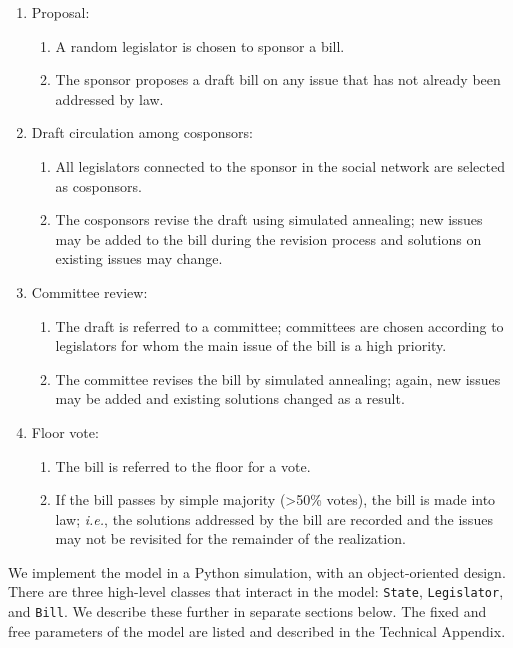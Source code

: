 \documentclass[pdftex,12pt]{llncs}
\begin{document}
\begin{enumerate}
  \item Proposal:
  \begin{enumerate}
    \item A random legislator is chosen to sponsor a bill.
    \item The sponsor proposes a draft bill on any issue that has not already been addressed by law.
  \end{enumerate}
  \item Draft circulation among cosponsors:
  \begin{enumerate}
    \item All legislators connected to the sponsor in the social network are selected as cosponsors.
    \item The cosponsors revise the draft using simulated annealing; new issues may be added to the bill during the revision process and solutions on existing issues may change.
  \end{enumerate}
  \item Committee review:
  \begin{enumerate}
    \item The draft is referred to a committee; committees are chosen according to legislators for whom the main issue of the bill is a high priority.
    \item The committee revises the bill by simulated annealing; again, new issues may be added and existing solutions changed as a result.
  \end{enumerate} 
  \item Floor vote:
    \begin{enumerate}
    \item The bill is referred to the floor for a vote.
    \item If the bill passes by simple majority (\textgreater 50\% votes), the bill is made into law; \textit{i.e.}, the solutions addressed by the bill are recorded and the issues may not be revisited for the remainder of the realization.
  \end{enumerate} 
\end{enumerate}

We implement the model in a Python simulation, with an object-oriented design. 
There are three high-level classes that interact in the model: \texttt{State}, \texttt{Legislator}, and \texttt{Bill}.  
We describe these further in separate sections below.
The fixed and free parameters of the model are listed and described in the Technical Appendix.
\end{document}
